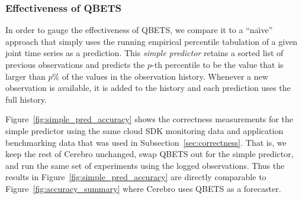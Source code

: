 %

\subsubsection{Effectiveness of QBETS}
\label{sec:learning}

In order to gauge the effectiveness of QBETS, we compare it to a ``na\"{\i}ve''
approach that simply uses the running empirical percentile tabulation
of a given joint time series as a prediction.
This \textit{simple predictor} retains a sorted list of previous observations
and
predicts the $p$-th percentile to be the value that is larger than $p\%$ of
the values in the observation history.  Whenever a new observation is
available, it is added to the history and each prediction uses the full
history.  

Figure~\ref{fig:simple_pred_accuracy} shows the correctness measurements for
the simple predictor using the same cloud SDK monitoring data and application
benchmarking data that was used in Subsection~\ref{sec:correctness}. 
That is, we keep the rest of Cerebro unchanged, swap QBETS out for the simple
predictor, and run the same set of experiments using the logged observations. 
Thus the results in 
Figure~\ref{fig:simple_pred_accuracy} are directly comparable to
Figure~\ref{fig:accuracy_summary} where Cerebro uses QBETS as a forecaster.  


